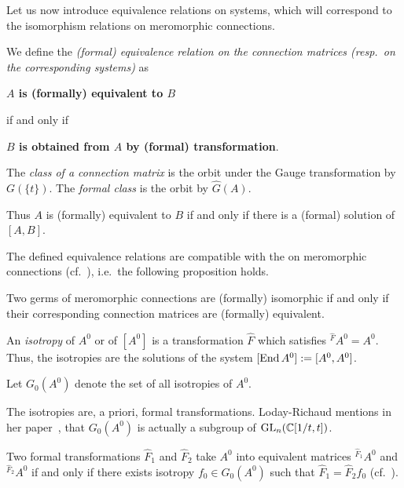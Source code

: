 Let us now introduce equivalence relations on systems, which will correspond to
the isomorphism relations on meromorphic connections.
\begin{defn}
  We define the \emph{(formal) equivalence relation on the connection matrices
  (resp.\ on the corresponding systems)} as
  \begin{einr}
    \textbf{\boldmath$A$ is (formally) equivalent to $B$}
  \end{einr}
  if and only if
  \begin{einr}
    \textbf{\boldmath$B$ is obtained from $A$ by (formal) transformation}.
  \end{einr}
  The \emph{class of a connection matrix} is the orbit under the Gauge
  transformation by $G(\!\{t\}\!)$. The \emph{formal class} is the orbit by
  $\hat G(A)$.
  \begin{s-rem}
    Thus $A$ is (formally) equivalent to $B$ if and only if there is a (formal)
    solution of $[A,B]$.
  \end{s-rem}
\end{defn}

The defined equivalence relations are compatible with the  on meromorphic connections (cf.\ \cite[Lem.5.1.3]{hotta2008}),
i.e.\ the following proposition holds.
\begin{prop}
  Two germs of meromorphic connections are (formally) isomorphic if and only if
  their corresponding connection matrices are (formally) equivalent.
\end{prop}

\begin{defn}\label{defn:isotropies}
  An \emph{isotropy} of $A^0$ or of $[A^0]$ is a transformation
  $\hat F$ which satisfies ${}^{\hat F}\!A^0=A^0$.
  Thus, the isotropies are the solutions of the system
  $[\operatorname{End} A^0]:=[A^0,A^0]$.

  Let $G_0(A^0)$ denote the set of all isotropies of $A^0$.
  \begin{s-rem}
    The isotropies are, a priori, formal transformations.
    Loday-Richaud mentions in her paper~\cite[853]{Loday1994}, that $G_0(A^0)$
    is actually a subgroup of $\operatorname{GL}_n(\mathbb{C}[1/t,t])$.
  \end{s-rem}
  \begin{s-lem}
    Two formal transformations $\hat F_1$ and $\hat F_2$ take $A^0$ into
    equivalent matrices ${}^{\hat F_1}\!A^0$ and  ${}^{\hat F_2}\!A^0$ if and
    only if there exists isotropy $f_0\in G_0(A^0)$ such that
    $\hat F_1=\hat F_2f_0$ (cf.~\cite[854]{Loday1994}).
  \end{s-lem}
\end{defn}

